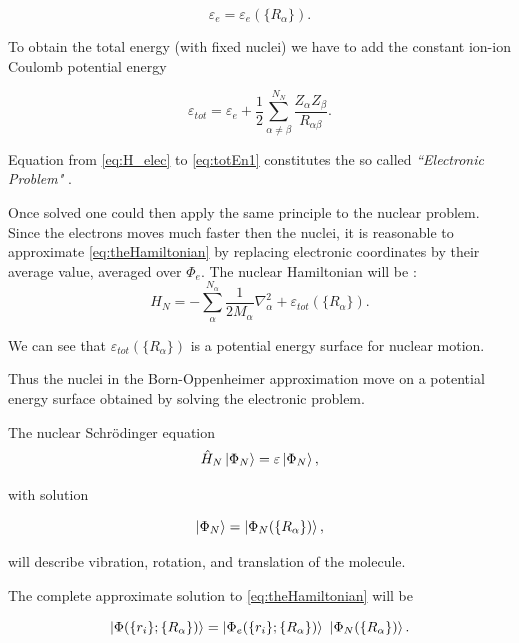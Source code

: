 \documentclass[a4paper,12pt]{article}
\begin{document}
\begin{equation}
	\varepsilon_{e} = \varepsilon_{e}(\{R_{\alpha}\}).
\end{equation}

To obtain the total energy (with fixed nuclei) we have to add the constant ion-ion Coulomb potential energy

\begin{equation}\label{eq:totEn1}
	\varepsilon_{tot} = \varepsilon_{e} + \frac{1}{2} \sum_{\alpha \neq \beta}^{N_N} \frac{Z_{\alpha} Z_{\beta} }{R_{\alpha \beta}}.
\end{equation}

Equation from \eqref{eq:H_elec} to \eqref{eq:totEn1} constitutes the so called \textit{``Electronic Problem"} \cite[p.44]{Attila}.

Once solved one could then apply the same principle to the nuclear problem.
Since the electrons moves much faster then the nuclei, it is reasonable to approximate \eqref{eq:theHamiltonian} by replacing electronic coordinates by their average value, averaged over $\Phi_{e}$.
The nuclear Hamiltonian will be :
\begin{equation}
	H_{N} = - \sum_{\alpha}^{N_{\alpha}} \frac{1}{2M_{\alpha}} \nabla_{\alpha}^2 + \varepsilon_{tot}(\{ R_{\alpha}\}).
\end{equation}

We can see that $\varepsilon_{tot}(\{ R_{\alpha}\})$ is a potential energy surface for nuclear motion.

Thus the nuclei in the Born-Oppenheimer approximation move on a potential energy surface obtained by solving the electronic problem.

The nuclear Schr\"odinger equation  
\begin{equation}
	\hat{H}_{N} \ket{\Phi_{N}} = \varepsilon \ket{\Phi_{N} },
\end{equation}

with solution 

\begin{equation}
	\ket{\Phi_{N}}=\ket{\Phi_{N}(\{R_{\alpha}\})},
\end{equation}

will describe vibration, rotation, and translation of the molecule.

The complete approximate solution to \eqref{eq:theHamiltonian} will be  \cite[p.43-45]{Attila}

\begin{equation}
	\ket{ \Phi(\{r_i\};\{R_{\alpha}\}) } 	= \ket{ \Phi_{e}(\{r_i\};\{R_{\alpha}\})} 
											~ \ket{ \Phi_{N}(\{R_{\alpha}\})}.
\end{equation}
\end{document}
